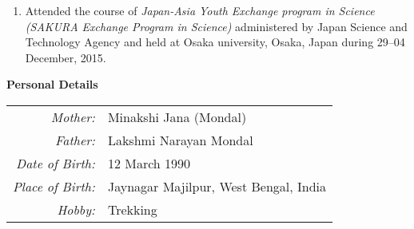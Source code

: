 \documentclass[12pt]{article}
\begin{document}
\begin{minipage}{1.05\textwidth}
\begin{enumerate}
\item Attended the course of \emph{Japan-Asia Youth Exchange program in Science (SAKURA Exchange Program in Science)} administered by Japan Science and Technology Agency and held at Osaka university, Osaka, Japan during 29--04 December, 2015. 



  
  

\end{enumerate}
\end{minipage}

\newpage
\vspace{0.6cm}
\colorbox{gray!40}{\begin{minipage}{17.5cm}
\bf {Personal Details}
\end{minipage} }

\begin{minipage}{1.05\textwidth}
\vspace{0.4cm}
\begin{tabular}{ r l}
  {\emph {Mother:}} & Minakshi Jana (Mondal) \\[0.2cm]
  {\emph {Father:}} & Lakshmi Narayan Mondal \\[0.2cm]
  {\emph {Date of Birth:}} & 12 March 1990 \\[0.2cm]
  {\emph {Place of Birth:}} & Jaynagar Majilpur, West Bengal, India \\[0.2cm]
  {\emph {Hobby:}} & Trekking \\[0.2cm]
\end{tabular}
\end{minipage} 
\end{document}

